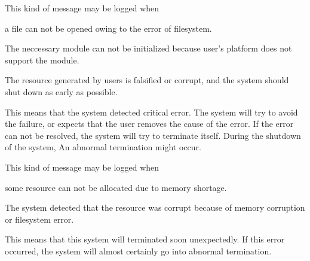 \begin{Desc}
\begin{description}
This kind of message may be logged when
\begin{DoxyItemize}
\item a file can not be opened owing to the error of filesystem.
\item The neccessary module can not be initialized because user's platform does not support the module.
\item The resource generated by users is falsified or corrupt, and the system should shut down as early as possible. 
\end{DoxyItemize}\item[{\em 
\hypertarget{structhryky_1_1log_1_1level_1_1_kind_aa121006343f8971f566b5490b8001b21a16a99a982de54fbc23410091030d2dd8}{alert\-\_\-}\label{structhryky_1_1log_1_1level_1_1_kind_aa121006343f8971f566b5490b8001b21a16a99a982de54fbc23410091030d2dd8}
}]This means that the system detected critical error. The system will try to avoid the failure, or expects that the user removes the cause of the error. If the error can not be resolved, the system will try to terminate itself. During the shutdown of the system, An abnormal termination might occur.

This kind of message may be logged when
\begin{DoxyItemize}
\item some resource can not be allocated due to memory shortage.
\item The system detected that the resource was corrupt because of memory corruption or filesystem error. 
\end{DoxyItemize}\item[{\em 
\hypertarget{structhryky_1_1log_1_1level_1_1_kind_aa121006343f8971f566b5490b8001b21a6b7056a2b5be42b04fd0e3ebb05db821}{emerg\-\_\-}\label{structhryky_1_1log_1_1level_1_1_kind_aa121006343f8971f566b5490b8001b21a6b7056a2b5be42b04fd0e3ebb05db821}
}]This means that this system will terminated soon unexpectedly. If this error occurred, the system will almost certainly go into abnormal termination.


\end{description}
\end{Desc}
